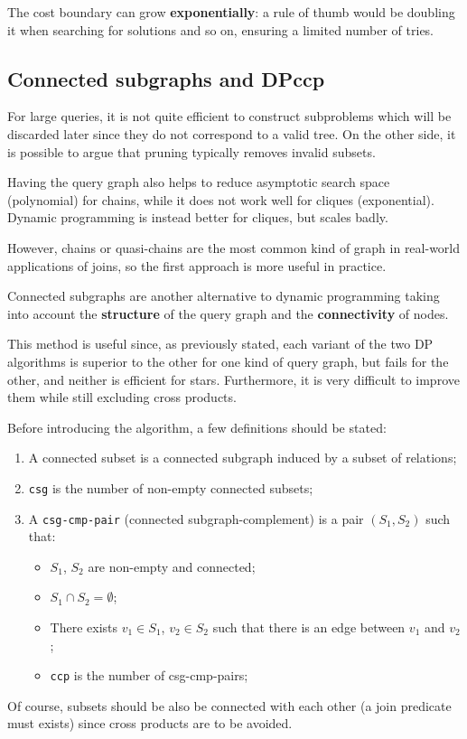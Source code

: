 The cost boundary can grow \textbf{exponentially}: a rule of thumb would be doubling it when searching for solutions and so on, ensuring a limited number of tries. 

\subsection{Connected subgraphs and DPccp}
For large queries, it is not quite efficient to construct subproblems which will be discarded later since they do not correspond to a valid tree. On the other side, it is possible to argue that pruning typically removes invalid subsets.

Having the query graph also helps to reduce asymptotic search space (polynomial) for chains, while it does not work well for cliques (exponential). Dynamic programming is instead better for cliques, but scales badly.

However, chains or quasi-chains are the most common kind of graph in real-world applications of joins, so the first approach is more useful in practice.

Connected subgraphs are another alternative to dynamic programming taking into account the \textbf{structure} of the query graph and the \textbf{connectivity} of nodes. 

This method is useful since, as previously stated, each variant of the two DP algorithms is superior to the other for one kind of query graph, but fails for the other, and neither is efficient for stars. Furthermore, it is very difficult to improve them while still excluding cross products.

Before introducing the algorithm, a few definitions should be stated:
\begin{enumerate}
	\item A connected subset is a connected subgraph induced by a subset of relations;
	\item \texttt{csg} is the number of non-empty connected subsets;
	\item A \texttt{csg-cmp-pair} (connected subgraph-complement) is a pair $(S_1, S_2)$ such that:
	\begin{itemize}
		\item $S_1$, $S_2$ are non-empty and connected;
		\item $S_1 \cap S_2 = \emptyset$;
		\item There exists $v_1 \in S_1$, $v_2 \in S_2$ such that there is an edge between $v_1$ and $v_2$;
		\item \texttt{ccp} is the number of csg-cmp-pairs;
	\end{itemize} 
\end{enumerate}
Of course, subsets should be also be connected with each other (a join predicate must exists) since cross products are to be avoided.

